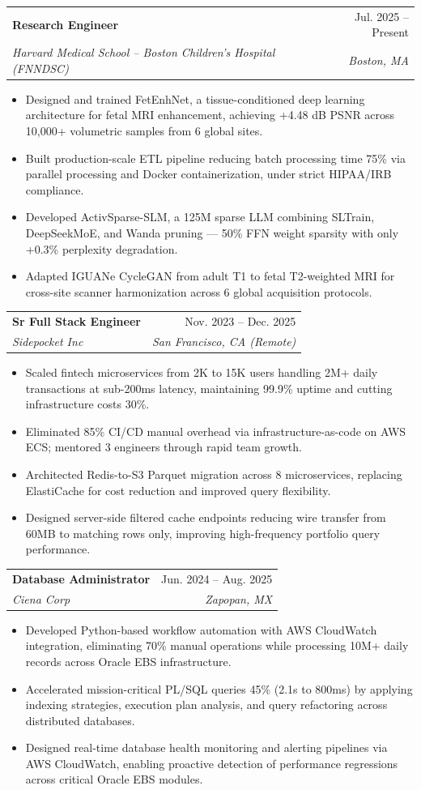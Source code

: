 \documentclass[letterpaper,10pt]{article}
\makeatletter
\newcommand{\resumeItem}[1]{
  \item\small{
    {#1 \vspace{-3pt}}
  }
}
\newcommand{\resumeSubheading}[4]{
  \vspace{-2pt}\item
    \begin{tabular*}{0.97\textwidth}[t]{l@{\extracolsep{\fill}}r}
      \textbf{#1} & #2 \\
      \textit{\small#3} & \textit{\small #4} \\
    \end{tabular*}\vspace{-8pt}
}
\newcommand{\resumeItemListStart}{\begin{itemize}}
\newcommand{\resumeItemListEnd}{\end{itemize}\vspace{-5pt}}
\makeatother
\begin{document}
    \resumeSubheading
      {Research Engineer}{Jul. 2025 -- Present}
      {Harvard Medical School -- Boston Children's Hospital (FNNDSC)}{Boston, MA}
      \resumeItemListStart
        \resumeItem{Designed and trained FetEnhNet, a tissue-conditioned deep learning architecture for fetal MRI enhancement, achieving +4.48 dB PSNR across 10,000+ volumetric samples from 6 global sites.}
        \resumeItem{Built production-scale ETL pipeline reducing batch processing time 75\% via parallel processing and Docker containerization, under strict HIPAA/IRB compliance.}
        \resumeItem{Developed ActivSparse-SLM, a 125M sparse LLM combining SLTrain, DeepSeekMoE, and Wanda pruning — 50\% FFN weight sparsity with only +0.3\% perplexity degradation.}
        \resumeItem{Adapted IGUANe CycleGAN from adult T1 to fetal T2-weighted MRI for cross-site scanner harmonization across 6 global acquisition protocols.}
      \resumeItemListEnd

    \resumeSubheading
      {Sr Full Stack Engineer}{Nov. 2023 -- Dec. 2025}
      {Sidepocket Inc}{San Francisco, CA (Remote)}
      \resumeItemListStart
        \resumeItem{Scaled fintech microservices from 2K to 15K users handling 2M+ daily transactions at sub-200ms latency, maintaining 99.9\% uptime and cutting infrastructure costs 30\%.}
        \resumeItem{Eliminated 85\% CI/CD manual overhead via infrastructure-as-code on AWS ECS; mentored 3 engineers through rapid team growth.}
        \resumeItem{Architected Redis-to-S3 Parquet migration across 8 microservices, replacing ElastiCache for cost reduction and improved query flexibility.}
        \resumeItem{Designed server-side filtered cache endpoints reducing wire transfer from 60MB to matching rows only, improving high-frequency portfolio query performance.}
      \resumeItemListEnd

    \resumeSubheading
      {Database Administrator}{Jun. 2024 -- Aug. 2025}
      {Ciena Corp}{Zapopan, MX}
      \resumeItemListStart
        \resumeItem{Developed Python-based workflow automation with AWS CloudWatch integration, eliminating 70\% manual operations while processing 10M+ daily records across Oracle EBS infrastructure.}
        \resumeItem{Accelerated mission-critical PL/SQL queries 45\% (2.1s to 800ms) by applying indexing strategies, execution plan analysis, and query refactoring across distributed databases.}
        \resumeItem{Designed real-time database health monitoring and alerting pipelines via AWS CloudWatch, enabling proactive detection of performance regressions across critical Oracle EBS modules.}
      \resumeItemListEnd
\end{document}

